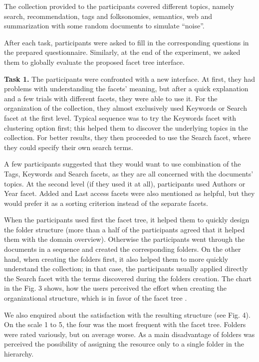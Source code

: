 \documentclass{article}
\begin{document}
     The collection provided to the participants covered different topics, namely search, recommendation, tags and folksonomies, semantics, web and summarization with some random documents to simulate “noise”. 
     
     After each task, participants were asked to fill in the corresponding questions in the prepared questionnaire. Similarly, at the end of the experiment, we asked them to globally evaluate the proposed facet tree interface.
   
\textbf{Task 1.} The participants were confronted with a new interface. At first, they had problems with understanding the facets’ meaning, but after a quick explanation and a few trials with different facets, they were able to use it. For the organization of the collection, they almost exclusively used Keywords or Search facet at the first level. Typical sequence was to try the Keywords facet with clustering option first; this helped them to discover the underlying topics in the collection. For better results, they then proceeded to use the Search facet, where they could specify their own search terms.

 A few participants suggested that they would want to use combination of the Tags, Keywords and Search facets, as they are all concerned with the documents’ topics. At the second level (if they used it at all), participants used Authors or Year facet. Added and Last access facets were also mentioned as helpful, but they would prefer it as a sorting criterion instead of the separate facets.
 
  When the participants used first the facet tree, it helped them to quickly design the folder structure (more than a half of the participants agreed that it helped them with the domain overview). Otherwise the participants went through the documents in a sequence and created the corresponding folders. On the other hand, when creating the folders first, it also helped them to more quickly understand the collection; in that case, the participants usually applied directly the Search facet with the terms discovered during the folders creation. The chart in the Fig. 3 shows, how the users perceived the effort when creating the organizational structure, which is in favor of the facet tree . 
  


We also enquired about the satisfaction with the resulting structure (see Fig. 4). On the scale 1 to 5, the four was the most frequent with the facet tree. Folders were rated variously, but on average worse. As a main disadvantage of folders was perceived the possibility of assigning the resource only to a single folder in the hierarchy. 
\end{document}
